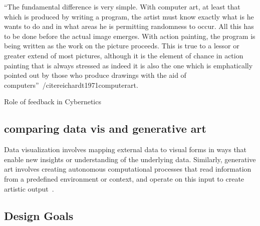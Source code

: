 \documentclass{sigchi}
\begin{document}
``The fundamental difference is very simple. With computer art, at least that which is produced by writing a program, the artist must know exactly what is he wants to do and in what areas he is permitting randomness to occur. All this has to be done before the actual image emerges. With action painting, the program is being written as the work on the picture proceeds. This is true to a lessor or greater extend of most pictures, although it is the element of chance in action painting that is always stressed as indeed it is also the one which is emphatically pointed out by those who produce drawings with the aid of computers''~/cite{reichardt1971computerart}.

Role of feedback in Cybernetics

\subsection{comparing data vis and generative art}

Data visualization involves mapping external data to visual forms in ways that enable new insights or understanding of the underlying data. Similarly, generative art involves creating autonomous computational processes that read information from a predefined environment or context, and operate on this input to create artistic output~\cite{schiffman,reas2010form,doi:10.1080/14626268.2012.709940}.

\subsection{Design Goals}
\end{document}
